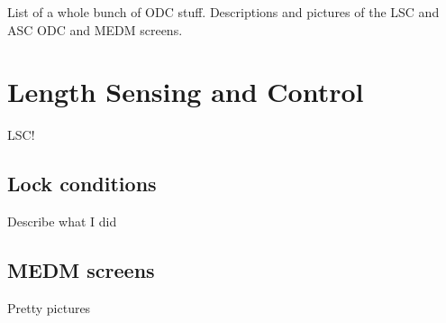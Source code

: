 List of a whole bunch of ODC stuff. Descriptions and pictures of the LSC and ASC ODC and MEDM screens.

\section{Length Sensing and Control}
LSC!

\subsection{Lock conditions}
Describe what I did

\subsection{MEDM screens}
Pretty pictures
